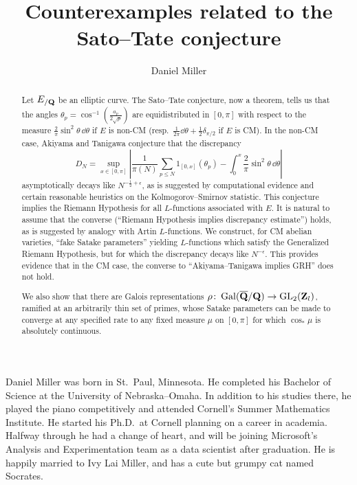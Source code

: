 \documentclass[phd,cornellheadings,tocprelim]{cornell}
\title{Counterexamples related to the Sato--Tate conjecture}
\author{Daniel Miller}
\begin{document}
\maketitle
\makecopyright

\begin{abstract}
Let $E_{/\mathbf{Q}}$ be an elliptic curve. The Sato--Tate conjecture, now a theorem, 
tells us that the angles $\theta_p =\cos^{-1}\left(\frac{a_p}{2\sqrt p}\right)$ 
are equidistributed in $[0,\pi]$ with respect to the measure 
$\frac{2}{\pi}\sin^2\theta\, \dd\theta$ if $E$ is non-CM
(resp.~$\frac{1}{2\pi} \dd \theta + \frac 1 2 \delta_{\pi/2}$ if $E$ is CM). 
In the non-CM case, Akiyama and Tanigawa conjecture that the discrepancy 
\[
	D_N = \sup_{x\in [0,\pi]} \left| \frac{1}{\pi(N)} \sum_{p\leqslant N} 1_{[0,x]}(\theta_p) - \int_0^x \frac{2}{\pi}\sin^2\theta\, \dd\theta\right| 
\]
asymptotically decays like $N^{-\frac 1 2+\epsilon}$, as is suggested by computational 
evidence and certain reasonable heuristics on the Kolmogorov--Smirnov 
statistic. This conjecture implies the Riemann Hypothesis 
for all $L$-functions associated with $E$. It is natural to assume that the 
converse (``Riemann Hypothesis implies discrepancy estimate'') holds, as is 
suggested by analogy with Artin $L$-functions. We construct, for CM abelian 
varieties, ``fake Satake parameters'' yielding $L$-functions which satisfy 
the Generalized Riemann Hypothesis, but for which the discrepancy decays like 
$N^{-\epsilon}$. This provides evidence that in the CM case, the converse to 
``Akiyama--Tanigawa implies GRH'' does not hold. 

We also show that there are Galois representations 
$\rho\colon \operatorname{Gal}(\overline {\mathbf{Q}} /\mathbf{Q}) \to \operatorname{GL}_2(\mathbf{Z}_l)$, ramified at an 
arbitrarily thin set of primes, whose Satake parameters can be made to 
converge at any specified rate to any fixed measure $\mu$ on $[0,\pi]$ for 
which $\cos_\ast\mu$ is absolutely continuous. 
\end{abstract}

\begin{biosketch}
Daniel Miller was born in St.~Paul, Minnesota. He completed his Bachelor of 
Science at the University of Nebraska--Omaha. In addition to his studies there, 
he played the piano competitively and attended Cornell's Summer Mathematics 
Institute. He started his Ph.D.~at Cornell planning on a career in academia. 
Halfway through he had a change of heart, and will be joining Microsoft's 
Analysis and Experimentation team as a data scientist after graduation. He is 
happily married to Ivy Lai Miller, and has a cute but grumpy cat named Socrates. 
\end{biosketch}
\end{document}
